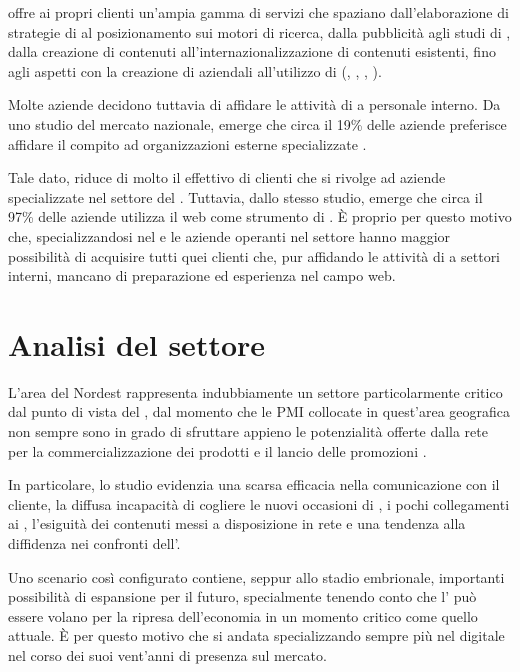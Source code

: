 \customer offre ai propri clienti un'ampia gamma di servizi che spaziano dall'elaborazione di strategie di \mktg al posizionamento sui motori di ricerca, dalla pubblicità  agli studi di , dalla creazione di contenuti all'internazionalizzazione di contenuti esistenti, fino agli aspetti  con la creazione di  aziendali all'utilizzo di  (, , , ).

Molte aziende decidono tuttavia di affidare le attività di \mktg a personale interno. Da uno studio del mercato nazionale, emerge che circa il 19\% delle aziende preferisce affidare il compito ad organizzazioni esterne specializzate \cite{picciaiola:indagine}.

Tale dato, riduce di molto il  effettivo di clienti che si rivolge ad aziende specializzate nel settore del \mktg.
Tuttavia, dallo stesso studio, emerge che circa il 97\% delle aziende utilizza il web come strumento di \mktg. È  proprio per questo motivo che, specializzandosi nel \mktg {} e  le aziende operanti nel settore hanno maggior possibilità di acquisire tutti quei clienti che, pur affidando le attività di \mktg a settori interni,  mancano di preparazione ed esperienza nel campo web.

\section{Analisi del settore}
L'area del Nordest rappresenta indubbiamente un settore particolarmente critico dal punto di vista del \mktg {}, dal momento che le PMI collocate in quest'area geografica non sempre sono in grado di sfruttare appieno le potenzialità offerte dalla rete per la commercializzazione dei prodotti e il lancio delle promozioni \cite[\itshape{}pag. 6 e succ.]{bassi:pmi}.

In particolare, lo studio evidenzia una scarsa efficacia nella comunicazione con il cliente, la diffusa incapacità di cogliere le nuovi occasioni di \bsn, i pochi collegamenti ai , l'esiguità dei contenuti messi a disposizione in rete e una tendenza alla diffidenza nei confronti dell'.

Uno scenario così configurato contiene, seppur allo stadio embrionale, importanti possibilità di espansione per il futuro, specialmente tenendo conto che l' può essere volano per la ripresa dell'economia in un momento critico come quello attuale. È per questo motivo che \customer si andata specializzando sempre più nel \mktg digitale nel corso dei suoi vent'anni di presenza sul mercato.

